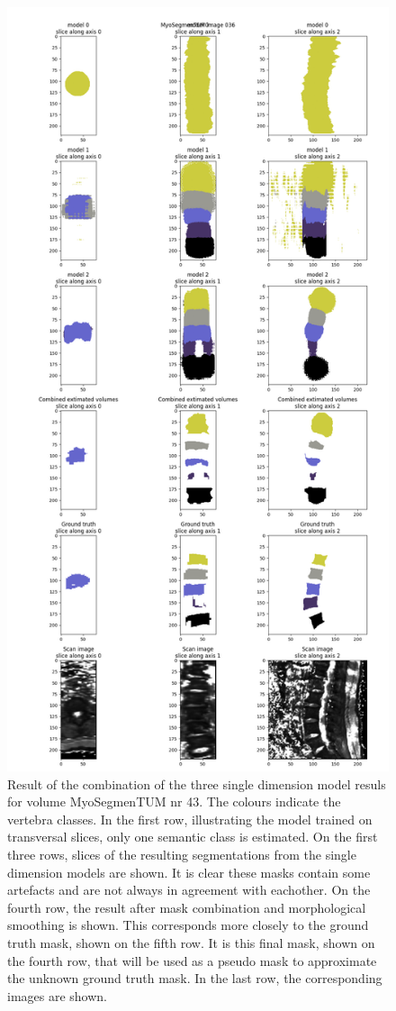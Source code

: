 \begin{figure}
    \centering
    \includegraphics[width=.95\textwidth]{images/morphmask_denoise1_erode1_MyoSegmenTUM_036.png}
    \caption{
        Result of the combination of the three single dimension model resuls for volume MyoSegmenTUM nr 43.
        The colours indicate the vertebra classes. In the first row, illustrating the model trained on transversal slices, only one semantic class is estimated.
        On the first three rows, slices of the resulting segmentations from the single dimension models are shown. 
        It is clear these masks contain some artefacts and are not always in agreement with eachother.
        On the fourth row, the result after mask combination and morphological smoothing is shown. 
        This corresponds more closely to the ground truth mask, shown on the fifth row.
        It is this final mask, shown on the fourth row, that will be used as a pseudo mask to approximate the unknown ground truth mask.
        In the last row, the corresponding images are shown.
    }
\end{figure}

